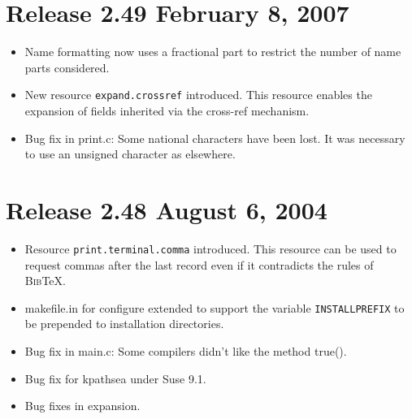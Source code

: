 \documentclass[11pt,a4paper]{scrartcl}
\newcommand\rsc[1]{\texttt{#1}}
\newcommand\File[1]{\textsf{#1}}
\newcommand\BibTeX{\textsc{Bib}\TeX}
\newenvironment{Release}[2]{%
  \def\tmp{#2}%
  \section*{Release #1 \ifx\tmp\empty\else{\normalsize[#2]}\fi}
  \begin{itemize}
}{\end{itemize}}
\newenvironment{Fix}[1]{\item }{}
\newenvironment{New}[1]{\item }{}
\begin{document}
\begin{multicols}
\begin{Release}{2.49}{February 8, 2007}
  \begin{New}{gene}
    Name formatting now uses a fractional part to restrict the number
    of name parts considered.
  \end{New}

  \begin{New}{gene}
    New resource \rsc{expand.crossref} introduced. This resource
    enables the expansion of fields inherited via the cross-ref
    mechanism.
  \end{New}
  \begin{Fix}{gene}
    Bug fix in \File{print.c}: Some national characters have been lost.
    It was necessary to use an unsigned character as elsewhere.
  \end{Fix}
 \end{Release}

 \begin{Release}{2.48}{August 6, 2004}
  \begin{New}{gene}
    Resource \rsc{print.terminal.comma} introduced. This resource can
    be used to request commas after the last record even if it
    contradicts the rules of \BibTeX.
  \end{New}
  \begin{New}{gene}
    \File{makefile.in} for configure extended to support the variable
    \texttt{INSTALLPREFIX} to be prepended to installation
    directories.
  \end{New}
  \begin{Fix}{gene}
    Bug fix in \File{main.c}: Some compilers didn't like the method
    true().
  \end{Fix}
  \begin{Fix}{gene}
    Bug fix for kpathsea under Suse 9.1.
  \end{Fix}
  \begin{Fix}{gene}
    Bug fixes in expansion.
  \end{Fix}


\end{Release}
\end{multicols}
\end{document}
